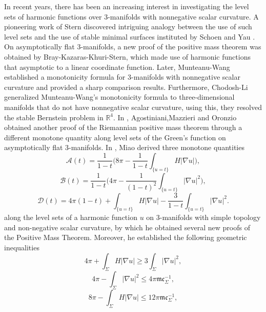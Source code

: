 \documentclass[12pt]{article}
\theoremstyle{definition}
\theoremstyle{plain}
\numberwithin{equation}{section}
\begin{document}
In recent years, there has been an increasing interest in investigating the level sets of harmonic functions over 3-manifolds with nonnegative scalar curvature. A pioneering work of Stern \cite{Stern} discovered intriguing analogy between the use of such level sets and the use of stable minimal surfaces instituted by Schoen and Yau \cite{SY1}. On asymptotically flat 3-manifolds, a new
proof of the positive mass theorem was obtained by Bray-Kazaras-Khuri-Stern\cite{Bray2},
which made use of harmonic functions that asymptotic to a linear coordinate function. Later, Munteanu-Wang \cite{Wang1} established a monotonicity formula for 3-manifolds with nonnegative scalar curvature and provided a sharp comparison results. Furthermore, Chodosh-Li \cite{Otis} generalized Munteanu-Wang's monotonicity formula to three-dimensional manifolds that do not have nonnegative scalar curvature, using this, they resolved the stable Bernstein problem in $ \mathbb{R}^{4} $. In \cite{Ag3}, Agostiniani,Mazzieri and Oronzio obtained another proof of the
Riemannian positive mass theorem through a different monotone quantity along level sets of the Green’s function on asymptotically flat 3-manifolds. In \cite{Miao}, Miao derived three monotone quantities 
\begin{equation}\label{A}
\mathcal{A}(t)=\frac{1}{1-t}\Big(8\pi-\frac{1}{1-t}\int_{\{u=t\}}H|\nabla u|\Big),
\end{equation}
\begin{equation}\label{B}
\mathcal{B}(t)=\frac{1}{1-t}\Big(4\pi-\frac{1}{(1-t)^{2}}\int_{\{u=t\}}|\nabla u|^{2}\Big),
\end{equation}
\begin{equation}\label{C}
\mathcal{D}(t)=4\pi(1-t)+\int_{\{u=t\}}H|\nabla u|-\frac{3}{1-t}\int_{\{u=t\}}|\nabla u|^{2}.
\end{equation}
along the level sets of a harmonic function $ u $ on 3-manifolds with simple topology and non-negative scalar curvature, by which he obtained several new proofs of the Positive Mass Theorem. Moreover, he established the following geometric inequalities
\begin{equation}\label{eq 1}
4\pi+\int_{\Sigma}H|\nabla u|\geq 3\int_{\Sigma}|\nabla u|^{2},
\end{equation}
\begin{equation}\label{eq 2}
4\pi-\int_{\Sigma}|\nabla u|^{2}\leq 4\pi \mathfrak{m}\mathfrak{c}_{\Sigma}^{-1},
\end{equation}
\begin{equation}\label{eq 3}
8\pi-\int_{\Sigma}H|\nabla u|\leq 12\pi\mathfrak{m}\mathfrak{c}_{\Sigma}^{-1},
\end{equation}
\end{document}
